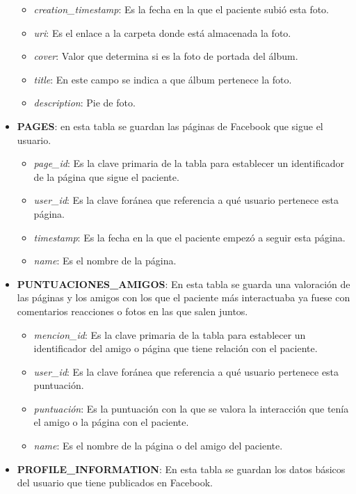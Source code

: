 \begin{itemize}
\begin{itemize}
		\item \textit{ creation\_timestamp}: Es la fecha en la que el paciente subió esta foto.
		\item \textit{ uri}: Es el enlace a la carpeta donde está almacenada la foto.
		\item \textit{ cover}: Valor que determina si es la foto de portada del álbum.
		\item \textit{ title}: En este campo se indica a que álbum pertenece la foto.
		\item \textit{ description}: Pie de foto.
	\end{itemize}
	\item \textbf{ PAGES}: en esta tabla se guardan las páginas de Facebook que sigue el usuario.
	\begin{itemize}
		\item \textit{ page\_id}: Es la clave primaria de la tabla para establecer un identificador de la página que sigue el paciente.
		\item \textit{ user\_id}: Es la clave foránea que referencia a qué usuario pertenece esta página.
		\item \textit{ timestamp}: Es la fecha en la que el paciente empezó a seguir esta página.
		\item \textit{ name}: Es el nombre de la página.
	\end{itemize}
	\item \textbf{ PUNTUACIONES\_AMIGOS}: En esta tabla se guarda una valoración de las páginas y los amigos con los que el paciente más interactuaba ya fuese con comentarios reacciones o fotos en las que salen juntos.
	\begin{itemize}
		\item \textit{ mencion\_id}: Es la clave primaria de la tabla para establecer un identificador del amigo o página que tiene relación con el paciente.
		\item \textit{ user\_id}: Es la clave foránea que referencia a qué usuario pertenece esta puntuación.
		\item \textit{ puntuación}: Es la puntuación con la que se valora la interacción que tenía el amigo o la página con el paciente.
		\item \textit{ name}: Es el nombre de la página o del amigo del paciente.
	\end{itemize}
	\item \textbf{ PROFILE\_INFORMATION}: En esta tabla se guardan los datos básicos del usuario que tiene publicados en Facebook.
	\begin{itemize}

\end{itemize}
\end{itemize}
